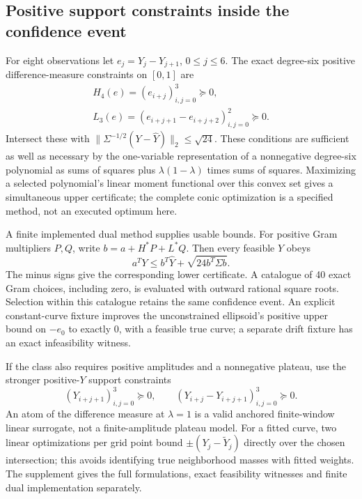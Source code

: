 \subsection{Positive support constraints inside the confidence event}
For eight observations let $e_j=Y_j-Y_{j+1}$, $0\le j\le 6$.
The exact degree-six positive difference-measure constraints on $[0,1]$ are
\[
 \begin{gathered}
 H_4(e)=(e_{i+j})_{i,j=0}^3\succeq 0,\\
 L_3(e)=(e_{i+j+1}-e_{i+j+2})_{i,j=0}^2\succeq 0.
 \end{gathered}
\]
Intersect these with
$\|\Sigma^{-1/2}(Y-\widehat Y)\|_2\le\sqrt{24}$.
These conditions are sufficient as well as necessary by the one-variable
representation of a nonnegative degree-six polynomial as sums of squares
plus $\lambda(1-\lambda)$ times sums of squares.
Maximizing a selected polynomial's linear moment functional over this
convex set gives a simultaneous upper certificate; the complete conic
optimization is a specified method, not an executed optimum here.

A finite implemented dual method supplies usable bounds. For positive
Gram multipliers $P,Q$, write $b=a+H^*P+L^*Q$. Then every feasible $Y$ obeys
\[
 a^TY\le b^T\widehat Y+\sqrt{24b^T\Sigma b}.
\]
The minus signs give the corresponding lower certificate. A catalogue of 40
exact Gram choices, including zero, is evaluated with outward rational
square roots. Selection within this catalogue retains the same confidence
event. An explicit constant-curve fixture improves the unconstrained
ellipsoid's positive upper bound on $-e_0$ to exactly 0, with a feasible
true curve; a separate drift fixture has an exact infeasibility witness.

If the class also requires positive amplitudes and a nonnegative plateau,
use the stronger positive-$Y$ support constraints
\[
 (Y_{i+j+1})_{i,j=0}^3\succeq 0,\qquad
 (Y_{i+j}-Y_{i+j+1})_{i,j=0}^3\succeq 0.
\]
An atom of the difference measure at $\lambda=1$ is a valid anchored
finite-window linear surrogate, not a finite-amplitude plateau model.
For a fitted curve, two linear optimizations per grid point bound
$\pm(Y_j-\widetilde Y_j)$ directly over the chosen intersection; this avoids
identifying true neighborhood masses with fitted weights. The supplement
gives the full formulations, exact feasibility witnesses and finite dual
implementation separately.

